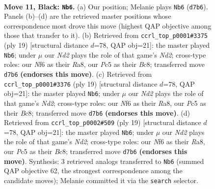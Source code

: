 \documentclass[11pt]{article}
\begin{document}
\clearpage

\begin{figure}[p]\centering
\begin{subfigure}{0.46\textwidth}\centering
\resizebox{\linewidth}{!}{%
\newchessgame
\chessboard[
  setfen={r1bq1rk1/p2n1ppp/4pn2/2pp4/8/2PBPNP1/PP3RPP/RN1Q2K1 b - - 1 11},
  showmover=false,
  pgfstyle=straightmove, color=movearrow, markmove={d7-b6}
]}
\caption{}
\end{subfigure}\hfill
\begin{subfigure}{0.46\textwidth}\centering
\resizebox{\linewidth}{!}{%
\newchessgame
\chessboard[
  setfen={r1bq1rk1/1ppn1ppp/4pn2/p7/P1pP4/5NP1/1P1QPPBP/RN3RK1 b - - 0 10},
  showmover=false,
  pgfstyle=straightmove, color=movearrow, markmove={d7-b6}
]}
\caption{}
\end{subfigure}
\\[4pt]
\begin{subfigure}{0.46\textwidth}\centering
\resizebox{\linewidth}{!}{%
\newchessgame
\chessboard[
  setfen={r1bq1rk1/1ppn1ppp/4pn2/p7/P1pP4/5NP1/1P1QPPBP/RN3RK1 b - - 0 10},
  showmover=false,
  pgfstyle=straightmove, color=movearrow, markmove={d7-b6}
]}
\caption{}
\end{subfigure}\hfill
\begin{subfigure}{0.46\textwidth}\centering
\resizebox{\linewidth}{!}{%
\newchessgame
\chessboard[
  setfen={r1bq1rk1/1ppn1ppp/4pn2/p7/P1pP4/5NP1/1P1QPPBP/RN3RK1 b - - 0 10},
  showmover=false,
  pgfstyle=straightmove, color=movearrow, markmove={d7-b6}
]}
\caption{}
\end{subfigure}
\caption{\textbf{Move 11, Black: \texttt{Nb6}.} (a) Our position; Melanie plays \texttt{Nb6} (\texttt{d7b6}). Panels (b)--(d) are the retrieved master positions whose correspondence most drove this move (highest QAP objective among those that transfer to it). (b) Retrieved from \texttt{ccrl\_top\_p0001\#3375} (ply 19) [structural distance $d$=78, QAP obj=21]: the master played \texttt{Nb6}; under $\mu$ our \emph{Nd2} plays the role of that game's \emph{Nd2}; cross-type roles: our \emph{N}f6 as their \emph{R}a8, our \emph{P}c5 as their \emph{B}c8; transferred move \texttt{d7b6} \textbf{(endorses this move)}. (c) Retrieved from \texttt{ccrl\_top\_p0001\#3376} (ply 19) [structural distance $d$=78, QAP obj=21]: the master played \texttt{Nb6}; under $\mu$ our \emph{Nd2} plays the role of that game's \emph{Nd2}; cross-type roles: our \emph{N}f6 as their \emph{R}a8, our \emph{P}c5 as their \emph{B}c8; transferred move \texttt{d7b6} \textbf{(endorses this move)}. (d) Retrieved from \texttt{ccrl\_top\_p0002\#509} (ply 19) [structural distance $d$=78, QAP obj=21]: the master played \texttt{Nb6}; under $\mu$ our \emph{Nd2} plays the role of that game's \emph{Nd2}; cross-type roles: our \emph{N}f6 as their \emph{R}a8, our \emph{P}c5 as their \emph{B}c8; transferred move \texttt{d7b6} \textbf{(endorses this move)}. Synthesis: 3 retrieved analogs transferred to \texttt{Nb6} (summed QAP objective 62, the strongest correspondence among the candidate moves); Melanie committed it via the \texttt{search} selector.}
\label{fig:thought-m21}
\end{figure}
\end{document}
